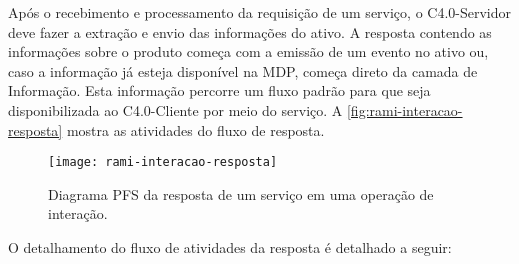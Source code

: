 	Após o recebimento e processamento da requisição de um serviço, o C4.0-Servidor deve fazer a extração e envio das informações do ativo. A resposta contendo as informações sobre o produto começa com a emissão de um evento no ativo ou, caso a informação já esteja disponível na MDP, começa direto da camada de Informação. Esta informação percorre um fluxo padrão para que seja disponibilizada ao C4.0-Cliente por meio do serviço. A \autoref{fig:rami-interacao-resposta} mostra as atividades do fluxo de resposta.

	\begin{figure}[htb]
		\centering
		\label{fig:rami-interacao-resposta}
		\texttt{[image: rami-interacao-resposta]}
		\caption{Diagrama PFS da resposta de um serviço em uma operação de interação.}
	\end{figure}
	
	O detalhamento do fluxo de atividades da resposta é detalhado a seguir:
	
